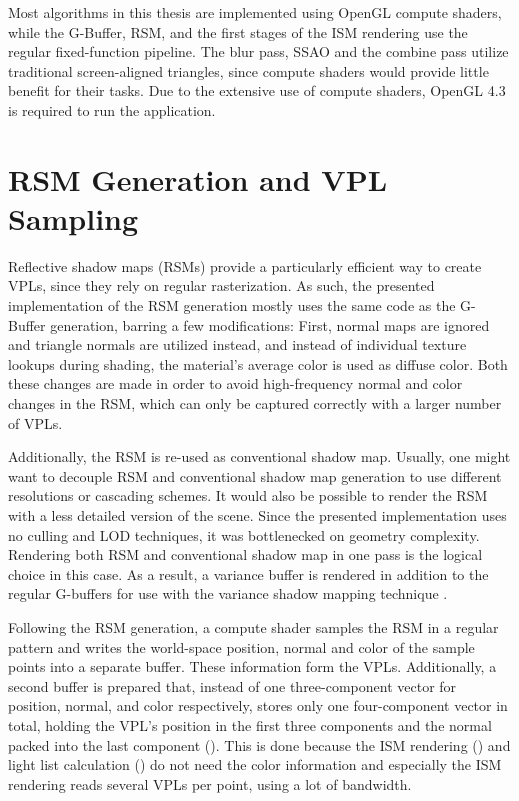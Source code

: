 Most algorithms in this thesis are implemented using OpenGL compute shaders, while the G-Buffer, RSM, and the first stages of the ISM rendering use the regular fixed-function pipeline. The blur pass, SSAO and the combine pass utilize traditional screen-aligned triangles, since compute shaders would provide little benefit for their tasks. Due to the extensive use of compute shaders, OpenGL 4.3 is required to run the application.


\section{RSM Generation and VPL Sampling}
\label{sec:impl:rsmAndVplSampling}

Reflective shadow maps (RSMs) provide a particularly efficient way to create VPLs, since they rely on regular rasterization. As such, the presented implementation of the RSM generation mostly uses the same code as the G-Buffer generation, barring a few modifications: First, normal maps are ignored and triangle normals are utilized instead, and instead of individual texture lookups during shading, the material's average color is used as diffuse color. Both these changes are made in order to avoid high-frequency normal and color changes in the RSM, which can only be captured correctly with a larger number of VPLs.

Additionally, the RSM is re-used as conventional shadow map. Usually, one might want to decouple RSM and conventional shadow map generation to use different resolutions or cascading schemes. It would also be possible to render the RSM with a less detailed version of the scene. Since the presented implementation uses no culling and LOD techniques, it was bottlenecked on geometry complexity. Rendering both RSM and conventional shadow map in one pass is the logical choice in this case. As a result, a variance buffer is rendered in addition to the regular G-buffers for use with the variance shadow mapping technique \citep{Donnelly:2006:VSM}.

Following the RSM generation, a compute shader samples the RSM in a regular pattern and writes the world-space position, normal and color of the sample points into a separate buffer. These information form the VPLs. Additionally, a second buffer is prepared that, instead of one three-component vector for position, normal, and color respectively, stores only one four-component vector in total, holding the VPL's position in the first three components and the normal packed into the last component (\citet{Cigolle:2014:NormalPacking}). This is done because the ISM rendering () and light list calculation () do not need the color information and especially the ISM rendering reads several VPLs per point, using a lot of bandwidth.


